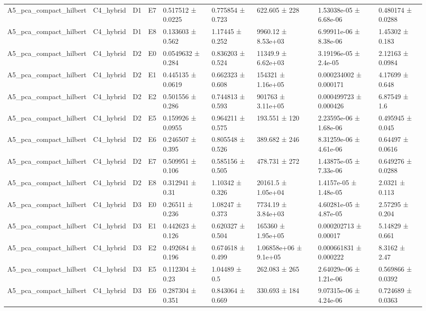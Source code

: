 \begin{table}
\begin{tabular}{lllllllll}
A5\_pca\_compact\_hilbert & C4\_hybrid & D1 & E7 & 0.517512 ± 0.0225 & 0.775854 ± 0.723 & 622.605 ± 228 & 1.53038e-05 ± 6.68e-06 & 0.480174 ± 0.0288 \\
A5\_pca\_compact\_hilbert & C4\_hybrid & D1 & E8 & 0.133603 ± 0.562 & 1.17445 ± 0.252 & 9960.12 ± 8.53e+03 & 6.99911e-06 ± 8.38e-06 & 1.45302 ± 0.183 \\
A5\_pca\_compact\_hilbert & C4\_hybrid & D2 & E0 & 0.0549632 ± 0.284 & 0.836203 ± 0.524 & 11349.9 ± 6.62e+03 & 3.19196e-05 ± 2.4e-05 & 2.12163 ± 0.0984 \\
A5\_pca\_compact\_hilbert & C4\_hybrid & D2 & E1 & 0.445135 ± 0.0619 & 0.662323 ± 0.608 & 154321 ± 1.16e+05 & 0.000234002 ± 0.000171 & 4.17699 ± 0.648 \\
A5\_pca\_compact\_hilbert & C4\_hybrid & D2 & E2 & 0.501556 ± 0.286 & 0.744813 ± 0.593 & 901763 ± 3.11e+05 & 0.000499723 ± 0.000426 & 6.87549 ± 1.6 \\
A5\_pca\_compact\_hilbert & C4\_hybrid & D2 & E5 & 0.159926 ± 0.0955 & 0.964211 ± 0.575 & 193.551 ± 120 & 2.23595e-06 ± 1.68e-06 & 0.495945 ± 0.045 \\
A5\_pca\_compact\_hilbert & C4\_hybrid & D2 & E6 & 0.246507 ± 0.395 & 0.805548 ± 0.526 & 389.682 ± 246 & 8.31259e-06 ± 4.61e-06 & 0.64497 ± 0.0616 \\
A5\_pca\_compact\_hilbert & C4\_hybrid & D2 & E7 & 0.509951 ± 0.106 & 0.585156 ± 0.505 & 478.731 ± 272 & 1.43875e-05 ± 7.33e-06 & 0.649276 ± 0.0288 \\
A5\_pca\_compact\_hilbert & C4\_hybrid & D2 & E8 & 0.312941 ± 0.31 & 1.10342 ± 0.326 & 20161.5 ± 1.05e+04 & 1.4157e-05 ± 1.48e-05 & 2.0321 ± 0.113 \\
A5\_pca\_compact\_hilbert & C4\_hybrid & D3 & E0 & 0.26511 ± 0.236 & 1.08247 ± 0.373 & 7734.19 ± 3.84e+03 & 4.60281e-05 ± 4.87e-05 & 2.57295 ± 0.204 \\
A5\_pca\_compact\_hilbert & C4\_hybrid & D3 & E1 & 0.442623 ± 0.126 & 0.620327 ± 0.504 & 165360 ± 1.95e+05 & 0.000202713 ± 0.00017 & 5.14829 ± 0.661 \\
A5\_pca\_compact\_hilbert & C4\_hybrid & D3 & E2 & 0.492684 ± 0.196 & 0.674618 ± 0.499 & 1.06858e+06 ± 9.1e+05 & 0.000661831 ± 0.000222 & 8.3162 ± 2.47 \\
A5\_pca\_compact\_hilbert & C4\_hybrid & D3 & E5 & 0.112304 ± 0.23 & 1.04489 ± 0.5 & 262.083 ± 265 & 2.64029e-06 ± 1.21e-06 & 0.569866 ± 0.0392 \\
A5\_pca\_compact\_hilbert & C4\_hybrid & D3 & E6 & 0.287304 ± 0.351 & 0.843064 ± 0.669 & 330.693 ± 184 & 9.07315e-06 ± 4.24e-06 & 0.724689 ± 0.0363 \\

\end{tabular}
\end{table}
